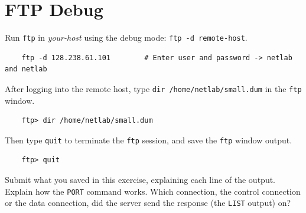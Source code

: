 \documentclass{UTNetLab}
\begin{document}
\section{FTP Debug}
    Run \lstinline{ftp} in \textit{your-host} using the debug mode: \lstinline[emph={your-host, remote-host}]{ftp -d remote-host}.
    
    \begin{lstlisting}
    ftp -d 128.238.61.101  		 # Enter user and password -> netlab and netlab    
    \end{lstlisting}
    After logging into the remote host, type \lstinline{dir /home/netlab/small.dum} in the \lstinline{ftp} window.
    
    \begin{lstlisting}
    ftp> dir /home/netlab/small.dum    
    \end{lstlisting}
    Then type \lstinline{quit} to terminate the \lstinline{ftp} session, and save the \lstinline{ftp} window output.
    
    \begin{lstlisting}
    ftp> quit    
    \end{lstlisting}
    \begin{report}
    \item Submit what you saved in this exercise, explaining each line of the output.
    Explain how the \lstinline{PORT} command works.
    Which connection, the control connection or the data connection, did the server send the response (the \lstinline{LIST} output) on?
    \end{report}
\end{document}
